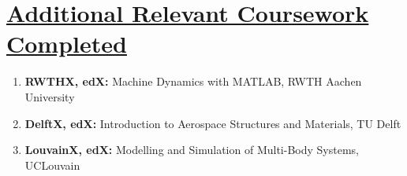 \documentclass{article}
\begin{document}
\section{\underline{Additional Relevant Coursework Completed}}
\begin{enumerate}
\item\large{\textbf{RWTHX, edX:} Machine Dynamics with MATLAB, RWTH Aachen University}
\item\large{\textbf{DelftX, edX:} Introduction to Aerospace Structures and Materials, TU Delft}
\item\large{\textbf{LouvainX, edX:} Modelling and Simulation of Multi-Body Systems, UCLouvain}
\end{enumerate}
\end{document}
